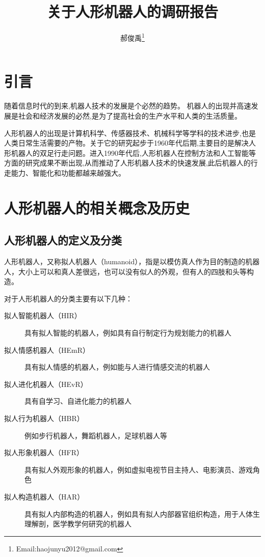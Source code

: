 \documentclass[10pt,a4paper]{article}
\begin{document}
\begin{CJK*}{UTF8}{gkai}
\title{关于人形机器人的调研报告}					   							%
\author{郝俊禹\thanks{Email:haojunyu2012@gmail.com}}				%
\date{}                                             				%
\maketitle                                          				%
\tableofcontents 												%
\clearpage


\section{引言}
随着信息时代的到来,机器人技术的发展是个必然的趋势。 机器人的出现并高速发展是社会和经济发展的必然,是为了提高社会的生产水平和人类的生活质量。 

人形机器人的出现是计算机科学、传感器技术、机械科学等学科的技术进步,也是人类日常生活需要的产物。关于它的研究起步于1960年代后期,主要目的是解决人形机器人的双足行走问题。进入1990年代后,人形机器人在控制方法和人工智能等方面的研究成果不断出现,从而推动了人形机器人技术的快速发展,此后机器人的行走能力、智能化和功能都越来越强大。



\section{人形机器人的相关概念及历史}
\subsection{人形机器人的定义及分类}
人形机器人，又称拟人机器人（humanoid），指是以模仿真人作为目的制造的机器人，大小上可以和真人差很远，也可以没有似人的外观，但有人的四肢和头等构造。\cite{1}

对于人形机器人的分类主要有以下几种\cite{2}：
\begin{description}
\item[拟人智能机器人（HIR）] 具有拟人智能的机器人，例如具有自行制定行为规划能力的机器人
\item[拟人情感机器人（HEmR）] 具有拟人情感的机器人，例如能与人进行情感交流的机器人
\item[拟人进化机器人（HEvR）] 具有自学习、自进化能力的机器人
\item[拟人行为机器人（HBR）] 例如步行机器人，舞蹈机器人，足球机器人等
\item[拟人形象机器人（HFR）] 具有拟人外观形象的机器人，例如虚拟电视节目主持人、电影演员、游戏角色
\item[拟人构造机器人（HAR）] 具有拟人内部构造的机器人，例如具有拟人内部器官组织构造，用于人体生理解剖，医学教学何研究的机器人
\end{description}


\end{CJK*}
\end{document}
